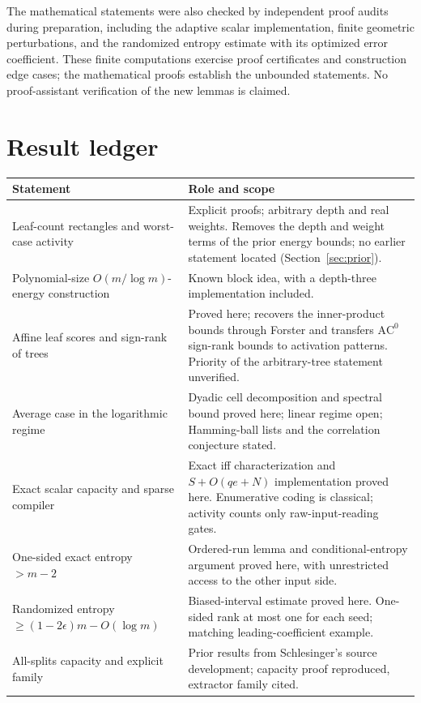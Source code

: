 \documentclass[11pt]{article}
\theoremstyle{definition}
\begin{document}
The mathematical statements were also checked by independent proof audits during preparation, including the adaptive scalar implementation, finite geometric perturbations, and the randomized entropy estimate with its optimized error coefficient. These finite computations exercise proof certificates and construction edge cases; the mathematical proofs establish the unbounded statements. No proof-assistant verification of the new lemmas is claimed.

\section{Result ledger}
\begin{center}
\small
\begin{tabularx}{\textwidth}{@{}>{\raggedright\arraybackslash}p{}>{\raggedright\arraybackslash}X@{}}
\toprule
Statement & Role and scope\\
\midrule
Leaf-count rectangles and worst-case activity & Explicit proofs; arbitrary depth and real weights. Removes the depth and weight terms of the prior energy bounds; no earlier statement located (Section~\ref{sec:prior}).\\
Polynomial-size \(O(m/\log m)\)-energy construction & Known block idea, with a depth-three implementation included.\\
Affine leaf scores and sign-rank of trees & Proved here; recovers the inner-product bounds through Forster and transfers \(\mathrm{AC}^0\) sign-rank bounds to activation patterns. Priority of the arbitrary-tree statement unverified.\\
Average case in the logarithmic regime & Dyadic cell decomposition and spectral bound proved here; linear regime open; Hamming-ball lists and the correlation conjecture stated.\\
Exact scalar capacity and sparse compiler & Exact iff characterization and \(S+O(qe+N)\) implementation proved here. Enumerative coding is classical; activity counts only raw-input-reading gates.\\
One-sided exact entropy \(>m-2\) & Ordered-run lemma and conditional-entropy argument proved here, with unrestricted access to the other input side.\\
Randomized entropy \(\ge(1-2\epsilon)m-O(\log m)\) & Biased-interval estimate proved here. One-sided rank at most one for each seed; matching leading-coefficient example.\\
All-splits capacity and explicit family & Prior results from Schlesinger's source development; capacity proof reproduced, extractor family cited.\\

\end{tabularx}
\end{center}
\end{document}
